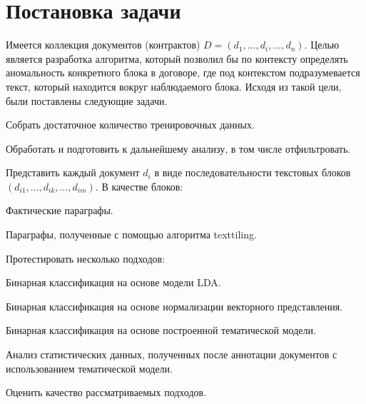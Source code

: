 \documentclass[12pt]{article}
\newcounter{c_tab}
\begin{document}
\section{Постановка задачи}
Имеется коллекция документов (контрактов) $D = (d_1,\ldots,d_i,\ldots,d_n)$.
Целью является разработка алгоритма, который позволил бы по контексту определять аномальность конкретного блока в договоре, где под контекстом подразумевается текст, который находится вокруг наблюдаемого блока. Исходя из такой цели, были поставлены следующие задачи.
\par\begin{enumerate}{
	\vspace{-0.2cm}\item Собрать достаточное количество тренировочных данных. 
	\vspace{-0.2cm}\item Обработать и подготовить к дальнейшему анализу, в том числе отфильтровать. 
	\vspace{-0.2cm}\item Представить каждый документ $d_i$ в виде последовательности текстовых блоков $(d_{i1}, \ldots, d_{ik}, \ldots, d_{im})$. В качестве блоков:
	\par\begin{itemize}{
				\vspace{-0.2cm}\item Фактические параграфы.
				\vspace{-0.2cm}\item Параграфы, полученные с помощью алгоритма texttiling.
	}\end{itemize}
	\vspace{-0.2cm}\item Протестировать несколько подходов:
	\par\begin{itemize}{
			\vspace{-0.2cm}\item Бинарная классификация на основе модели LDA.
			\vspace{-0.2cm}\item Бинарная классификация на основе нормализации векторного представления.
			\vspace{-0.2cm}\item Бинарная классификация на основе построенной тематической модели.
			\vspace{-0.2cm}\item Анализ статистических данных, полученных после аннотации документов с использованием тематической модели.
	}\end{itemize}
	\vspace{-0.2cm}\item Оценить качество рассматриваемых подходов.
}\end{enumerate}
\end{document}

